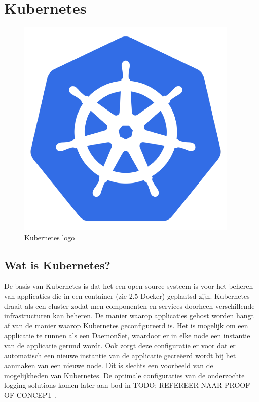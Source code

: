 \section{Kubernetes}
\label{sec:kubernetes}

\begin{figure}[ht]
    \centering
   \includegraphics[scale=0.3]{img/Kubernetes_logo}
    \caption[Kubernetes logo]{Kubernetes logo \cite{kubernetes}}
\end{figure}

\subsection{Wat is Kubernetes?}
De basis van Kubernetes is dat het een open-source systeem is voor het beheren van applicaties die in een container (zie 2.5 Docker) geplaatsd zijn. Kubernetes draait als een cluster zodat men  componenten en services doorheen verschillende infrastructuren kan beheren. De manier waarop applicaties gehost worden hangt af van de manier waarop Kubernetes geconfigureerd is. Het is mogelijk om een applicatie te runnen als een DaemonSet, waardoor er in elke node een instantie van de applicatie gerund wordt. Ook zorgt deze configuratie er voor dat er automatisch een nieuwe instantie van de applicatie gecreëerd wordt bij het aanmaken van een nieuwe node. Dit is slechts een voorbeeld van de mogelijkheden van Kubernetes. De optimale configuraties van de onderzochte logging solutions komen later aan bod in TODO: REFEREER NAAR PROOF OF CONCEPT \autocite{ellingwood2018}.

